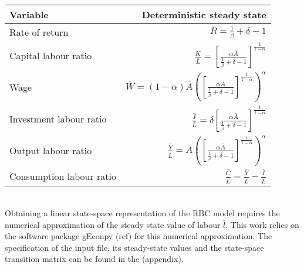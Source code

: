 \documentclass[12pt,a4paper,english]{article} %
\newcommand{\Rss}{\frac{1}{\beta} + \delta - 1}
\newcommand{\Ass}{\bar{A}}
\newcommand{\KLss}{\left[ \frac{\alpha \Ass}{\Rss} \right]^{\frac{1}{1-\alpha}}}
\begin{document}
	\begin{tabular}{lr}
		\textbf{Variable} & \textbf{Deterministic steady state}\\
		\hline 
		Rate of return & $\bar{R} = \Rss$ \\
		Capital labour ratio & $\frac{\bar{K}}{\bar{L}} = \KLss$ \\
		Wage & $\bar{W} = (1 - \alpha) \Ass \left(\KLss\right)^\alpha$ \\
		Investment labour ratio & $\frac{\bar{I}}{\bar{L}} = \delta \KLss$ \\
		Output labour ratio & $\frac{\bar{Y}}{\bar{L}} = \Ass \left(\KLss\right)^\alpha$ \\
		Consumption labour ratio & $\frac{\bar{C}}{\bar{L}} = \frac{\bar{Y}}{\bar{L}} - \frac{\bar{I}}{\bar{L}}$ \\
	\end{tabular}\\

	Obtaining a linear state-space representation of the RBC model requires the numerical approximation of the steady state value of labour $\bar{l}$. This work relies on the software package gEconpy (ref) for this numerical approximation. The specification of the input file, its steady-state values and the state-space transition matrix can be found in the (appendix). 

	
	
	
	
	

	
	

	
	
\end{document}
